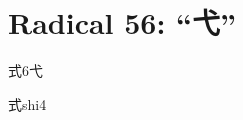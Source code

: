 
\section*{Radical 56: ``⼷''}

\begin{entry}{式}{6}{⼷}
  \begin{phonetics}{式}{shi4}
  \end{phonetics}
\end{entry}


